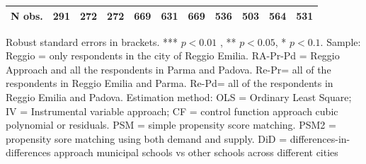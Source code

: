 \documentclass[12pt]{article}
\begin{document}
\begin{table}[ht]
\begin{center}
\begin{adjustbox}{width=1.2\textwidth,center=\textwidth}
\begin{tabular}{l*{10}{c}}
\hline
N obs. &  291 & 272 & 272 & 669 & 631 & 669 & 536 & 503 & 564 & 531 \\
\hline
\end{tabular}
\end{adjustbox}
\end{center}
\par
\vspace{1ex}
\par
{\footnotesize \raggedright{Robust standard errors in brackets. *** $p<0.01$%
, ** $p<0.05$, * $p<0.1$. Sample: Reggio = only respondents in the city of
Reggio Emilia. RA-Pr-Pd = Reggio Approach and all the respondents in Parma
and Padova. Re-Pr= all of the respondents in Reggio Emilia and Parma. Re-Pd=
all of the respondents in Reggio Emilia and Padova. Estimation method: OLS =
Ordinary Least Square; IV = Instrumental variable approach; CF = control
function approach cubic polynomial or residuals. PSM = simple propensity
score matching. PSM2 = propensity sore matching using both demand and
supply. DiD = differences-in-differences approach municipal schools vs other
schools across different cities} }
\end{table}
\end{document}
